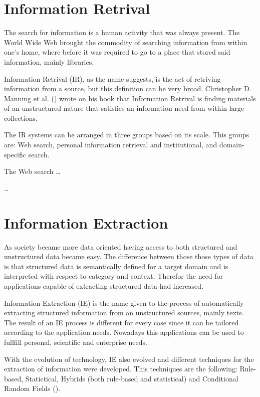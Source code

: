 \section{Information Retrival}

The search for information is a human activity that was always present.
The World Wide Web brought the commodity of searching information from within one's home, where before it was required to go to a place that stored said information, mainly libraries.

Information Retrival (IR), as the name suggests, is the act of retriving information from a source, but this definition can be very broad.
Christopher D. Manning et al. (\citeyear{manning_2008}) wrote on his book that Information Retrival is finding materials of an unstructured nature that satisfies an information need from within large collections.

The IR systems can be arranged in three groups based on its scale.
This groups are: Web search, personal information retrieval and institutional, and domain-specific search.

The Web search \dots

\dots

\section{Information Extraction}

As society became more data oriented having access to both structured and unstructured data became easy.
The difference between those those types of data is that structured data is semantically defined for a target domain and is interpreted with respect to category and context.
Therefor the need for applications capable of extracting structured data had increased.

Information Extraction (IE) is the name given to the process of automatically extracting structured information from an unstructured sources, mainly texts.
The result of an IE process is different for every case since it can be tailored according to the application needs.
Nowadays this applications can be used to fullfill personal, scientific and enterprise needs.

With the evolution of technology, IE also evolved and different techniques for the extraction of information were developed.
This techniques are the following: Rule-based, Statictical, Hybrids (both rule-based and statistical) and Conditional Random Fields (\cite{sarawagi_2008}).

